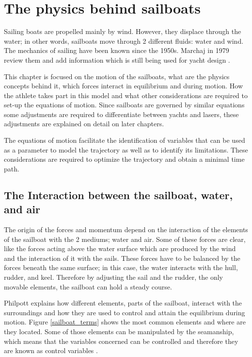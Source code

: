 \chapter{The physics behind sailboats} \label{ch:physics_sailboat}

Sailing boats are propelled mainly by wind. However, they displace through the water; in other words, sailboats move through 2 different fluids: water and wind. The mechanics of sailing have been known since the 1950s. Marchaj in 1979 review them and add information which is still being used for yacht design \cite{marchajaereo1979}.\par 

This chapter is focused on the motion of the sailboats, what are the physics concepts behind it, which forces interact in equilibrium and during motion. How the athlete takes part in this model and what other considerations are required to set-up the equations of motion. Since sailboats are governed by similar equations some adjustments are required to differentiate between yachts and lasers, these adjustments are explained on detail on later chapters. \par 
The equations of motion facilitate the identification of variables that can be used as a parameter to model the trajectory as well as to identify its limitations. These considerations are required to optimize the trajectory and obtain a minimal time path. \par
\section{The Interaction between the sailboat, water, and air} \label{sec:interaction_boat_environ}
The origin of the forces and momentum depend on the interaction of the elements of the sailboat with the 2 mediums; water and air. Some of these forces are clear, like the forces acting above the water surface which are produced by the wind and the interaction of it with the sails. These forces have to be balanced by the forces beneath the same surface; in this case, the water interacts with the hull, rudder, and keel. Therefore by adjusting the sail and the rudder, the only movable elements, the sailboat can hold a steady course.\par

Philpott explains how different elements, parts of the sailboat, interact with the surroundings and how they are used to control and attain the equilibrium during motion. Figure \ref{sailboat_terms} shows the most common elements and where are they located. Some of those elements can be manipulated by the seamanship, which means that the variables concerned can be controlled and therefore they are known as control variables \cite{philpott1993yacht}. \par

